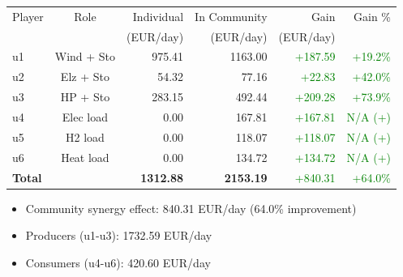 \begin{frame}
    \begin{table}[h]
    \centering
    \small
    \begin{tabular}{l|c|r|r|r|r}
    \toprule
    Player & Role & Individual & In Community & Gain & Gain \% \\
        &      & (EUR/day) & (EUR/day) & (EUR/day) & \\
    \midrule
    u1 & Wind + Sto & 975.41 & 1163.00 & \textcolor{green}{+187.59} & \textcolor{green}{+19.2\%} \\
u2 & Elz + Sto & 54.32 & 77.16 & \textcolor{green}{+22.83} & \textcolor{green}{+42.0\%} \\
u3 & HP + Sto & 283.15 & 492.44 & \textcolor{green}{+209.28} & \textcolor{green}{+73.9\%} \\
u4 & Elec load & 0.00 & 167.81 & \textcolor{green}{+167.81} & \textcolor{green}{N/A (+)} \\
u5 & H2 load & 0.00 & 118.07 & \textcolor{green}{+118.07} & \textcolor{green}{N/A (+)} \\
u6 & Heat load & 0.00 & 134.72 & \textcolor{green}{+134.72} & \textcolor{green}{N/A (+)} \\
\midrule
    \textbf{Total} & & \textbf{1312.88} & \textbf{2153.19} & \textcolor{green}{+840.31} & \textcolor{green}{+64.0\%} \\
    \bottomrule
    \end{tabular}
    \end{table}

    \vspace{0.5em}
    \begin{itemize}
    \item Community synergy effect: 840.31 EUR/day (64.0\% improvement)
    \item Producers (u1-u3): 1732.59 EUR/day
    \item Consumers (u4-u6): 420.60 EUR/day
    \end{itemize}
    \end{frame}